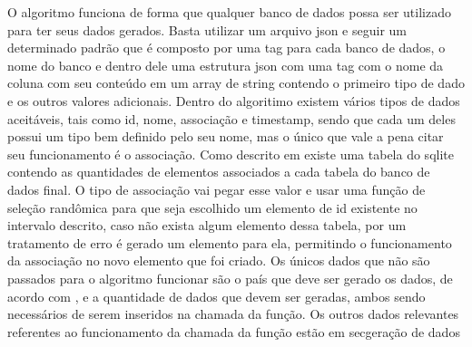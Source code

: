 \documentclass[
	12pt,				%
	openright,			%
	oneside,			%
	a4paper,			%
	english,			%
	french,				%
	spanish,			%
	brazil,				%
	]{abntex2}
\begin{document}
O algoritmo funciona de forma que qualquer banco de dados possa ser utilizado para ter seus dados gerados.
Basta utilizar um arquivo json e seguir um determinado padrão que é composto por uma tag para cada banco de dados,
o nome do banco e dentro dele uma estrutura json com uma tag com o nome da coluna com seu conteúdo em um array de string contendo o primeiro tipo de dado e os outros valores adicionais.\newline
Dentro do algoritimo existem vários tipos de dados aceitáveis, tais como id, nome, associação e timestamp,
sendo que cada um deles possui um tipo bem definido pelo seu nome, mas o único que vale a pena citar seu funcionamento é o associação.
Como descrito em  existe uma tabela do sqlite contendo as quantidades de elementos associados a cada tabela do banco de dados final.
O tipo de associação vai pegar esse valor e usar uma função de seleção randômica para que seja escolhido um elemento de id existente no intervalo descrito,
caso não exista algum elemento dessa tabela, por um tratamento de erro é gerado um elemento para ela, permitindo o funcionamento da associação no novo elemento que foi criado.\newline
Os únicos dados que não são passados para o algoritmo funcionar são o país que deve ser gerado os dados, de acordo com ,
e a quantidade de dados que devem ser geradas, ambos sendo necessários de serem inseridos na chamada da função.
Os outros dados relevantes referentes ao funcionamento da chamada da função estão em {sec}{geração de dados}
\end{document}
